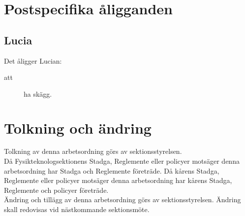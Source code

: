 \section{Postspecifika åligganden}
\subsection{Lucia}
Det åligger Lucian:
\begin{description}
    \item[att] ha skägg.
\end{description}

\section{Tolkning och ändring}
Tolkning av denna arbetsordning görs av sektionsstyrelsen.\\ Då Fysikteknologsektionens Stadga, Reglemente eller policyer motsäger denna arbetsordning har Stadga och Reglemente företräde. Då kårens Stadga, Reglemente eller policyer motsäger denna arbetsordning har kårens Stadga, Reglemente och policyer företräde.\\
Ändring och tillägg av denna arbetsordning görs av sektionsstyrelsen. Ändring skall redovisas vid nästkommande sektionsmöte. 

\newpage 
 